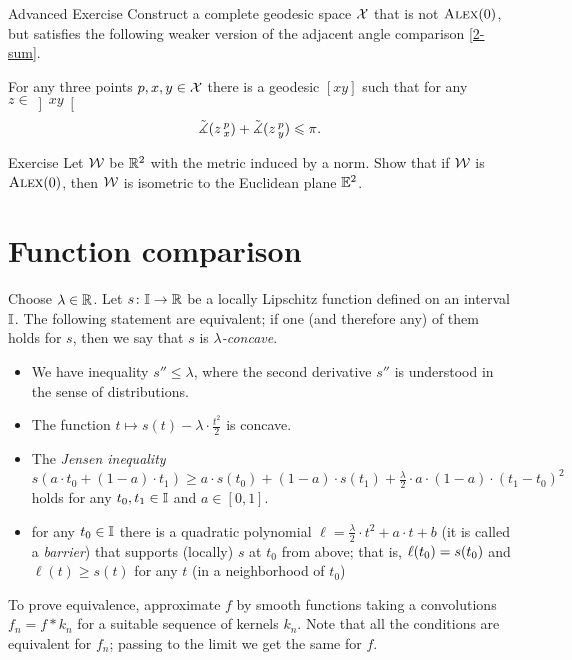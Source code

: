 \begin{thm}{Advanced Exercise}\label{ex:urysohn}
Construct a complete geodesic space $\mathcal{X}$ that is not $\textsc{Alex}(0)$, but satisfies the following weaker version of the adjacent angle comparison \ref{2-sum}.

For any three points $p,x,y\in \mathcal{X}$ there is a geodesic $[x y]$ such that for any $z\in \left]x y\right[$
\[\tilde\measuredangle(z\,{}^{p}_{x})+\tilde\measuredangle(z\,{}^{p}_{y})
\leqslant
\pi.\]
\end{thm}

\begin{thm}{Exercise}\label{ex:normCBB}
Let $\mathcal{W}$ be $\mathbb{R}^2$ with the metric induced by a norm.
Show that if $\mathcal{W}$ is $\textsc{Alex}(0)$, then $\mathcal{W}$ is isometric to the Euclidean plane $\mathbb{E}^2$.
\end{thm}

\section{Function comparison}\label{Function comparison}

Choose $\lambda\in \mathbb{R}$.
Let $s\colon\mathbb{I}\to\mathbb{R}$ be a locally Lipschitz function defined on an interval $\mathbb{I}$.
The following statement are equivalent;
if one (and therefore any) of them holds for $s$, then we say that $s$ is \emph{$\lambda$-concave}.
\begin{itemize}
\item We have inequality $s''\le \lambda$, where the second derivative $s''$ is understood in the sense of distributions.
\item The function $t\mapsto s(t)-\lambda\cdot\tfrac{t^2}2$ is concave.
\item The \emph{Jensen inequality}
\[s(a\cdot t_0+(1-a)\cdot t_1)\ge a\cdot s(t_0)+(1-a)\cdot s(t_1)+\tfrac\lambda2\cdot a\cdot(1-a)\cdot(t_1-t_0)^2 \]
holds for any $t_0,t_1\in \mathbb{I}$ and $a\in[0,1]$.
\item for any $t_0\in \mathbb{I}$ there is a quadratic polynomial $\ell=\tfrac\lambda2\cdot t^2+a\cdot t+b$ (it is called a \emph{barrier}) that supports (locally) $s$ at $t_0$ from above;
that is, $\ell(t_0)= s(t_0)$ and $\ell(t)\ge s(t)$ for any $t$ (in a neighborhood of $t_0$)
\end{itemize}

To prove equivalence, approximate $f$ by smooth functions taking a convolutions $f_n=f*k_n$ for a suitable sequence of kernels $k_n$.
Note that all the conditions are equivalent for $f_n$;
passing to the limit we get the same for $f$.

